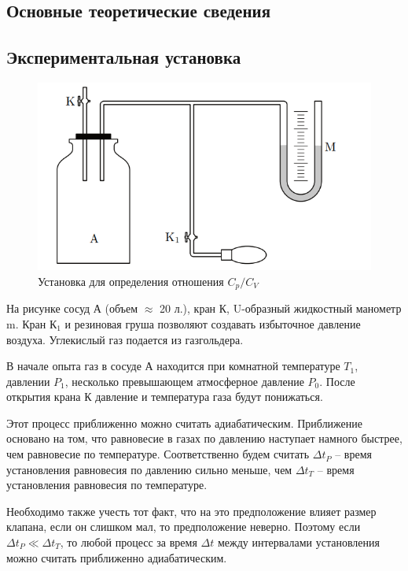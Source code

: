 \documentclass[a4paper,12pt]{report}
\begin{document}
    \begin{multicols}{2}    
    \section{Основные теоретические сведения}
    \subsection*{Экспериментальная установка}
        \begin{figure}[H]
            \includegraphics*[width=0.9\columnwidth]{ustanovka.png}
            \centering
            \caption{Установка для определения отношения $C_p/C_V$}
        \end{figure}
        На рисунке сосуд А (объем $\approx$ 20 л.), кран К, U-образный жидкостный манометр m. Кран К$_1$ и резиновая груша позволяют создавать избыточное давление воздуха. Углекислый газ подается из газгольдера.

        В начале опыта газ в сосуде А находится при комнатной температуре $T_1$, давлении $P_1$, несколько превышающем атмосферное давление $P_0$. После открытия крана К давление и температура газа будут понижаться.

        Этот процесс приближенно можно считать адиабатическим. Приближение основано на том, что равновесие в газах по давлению наступает намного быстрее, чем равновесие по температуре. Соответственно будем считать $\Delta t_P$ -- время установления равновесия по давлению сильно меньше, чем $\Delta t_T$ -- время установления равновесия по температуре.

        Необходимо также учесть тот факт, что на это предположение влияет размер клапана, если он слишком мал, то предположение неверно. Поэтому если $\Delta t_P \ll \Delta t_T$, то любой процесс за время $\Delta t$ между интервалами установления можно считать приближенно адиабатическим.


\end{multicols}
\end{document}
